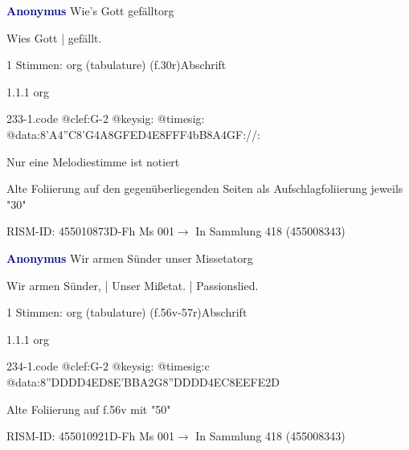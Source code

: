 \documentclass[twocolumn]{book}
\begin{document}
\par \vspace{7pt} \textcolor{darkblue}{\textbf{Anonymus  }}\hfillplus{\textbf{[233]}}\newline Wie's Gott gefällt\newline org
\par \begin{itshape}[f.30r, at left:] Wies Gott | gefällt.\end{itshape} 
\par \textcolor{darkblue}{}  1 Stimmen: org (tabulature)  (f.30r)\newline Abschrift
\par 1.1.1  org  
\begin{filecontents*}{233-1.code}
@clef:G-2
@keysig:
@timesig:
@data:8'A4''C8'G4A8G{FE}D4E{8FFF}4bB8A4GF://:
\end{filecontents*}
\newline
%
\par Nur eine Melodiestimme ist notiert
\par Alte Foliierung auf den gegenüberliegenden Seiten als Aufschlagfoliierung jeweils "30"
\par RISM-ID: 455010873\newline D-Fh  Ms 001\newline $\rightarrow$ In Sammlung 418 (455008343)
      
\par \vspace{7pt} \textcolor{darkblue}{\textbf{Anonymus  }}\hfillplus{\textbf{[234]}}\newline Wir armen Sünder unser Missetat\newline org
\par \begin{itshape}[f.56v, at left:] Wir armen Sünder, | Unser Mißetat. | Passionslied.\end{itshape} 
\par \textcolor{darkblue}{}  1 Stimmen: org (tabulature)  (f.56v-57r)\newline Abschrift
\par 1.1.1  org  
\begin{filecontents*}{234-1.code}
@clef:G-2
@keysig:
@timesig:c
@data:{8''DDDD}4ED{8E'BBA}2G{8''DDDD}4EC{8EEFE}2D
\end{filecontents*}
\newline
%
\par Alte Foliierung auf f.56v mit "50"
\par RISM-ID: 455010921\newline D-Fh  Ms 001\newline $\rightarrow$ In Sammlung 418 (455008343)
      
\end{document}
